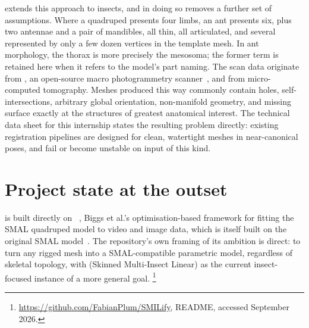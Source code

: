  extends this approach to insects, and in doing so removes a
further set of assumptions. Where a quadruped presents four limbs, an ant
presents six, plus two antennae and a pair of mandibles, all thin, all
articulated, and several represented by only a few dozen vertices in the
template mesh. In ant morphology, the thorax is more precisely the mesosoma;
the former term is retained here when it refers to the model's part naming.
The scan data originate from , an open-source macro
photogrammetry scanner~\cite{scant}, and from micro-computed tomography.
Meshes produced this way commonly contain holes, self-intersections, arbitrary
global orientation, non-manifold geometry, and missing surface exactly at the
structures of greatest anatomical interest. The technical data sheet for this
internship states the resulting problem directly: existing registration
pipelines are designed for clean, watertight meshes in near-canonical poses,
and fail or become unstable on input of this kind.

\section{Project state at the outset}

 is built directly on ~\cite{smalify}, Biggs et
al.'s optimisation-based framework for fitting the SMAL quadruped model to
video and image data, which is itself built on the original SMAL
model~\cite{smal}. The repository's own framing of its ambition is direct: to
turn any rigged mesh into a SMAL-compatible parametric model, regardless of
skeletal topology, with  (Skinned Multi-Insect Linear) as the
current insect-focused instance of a more general goal.
\footnote{\url{https://github.com/FabianPlum/SMILify}, README, accessed
September 2026.}

